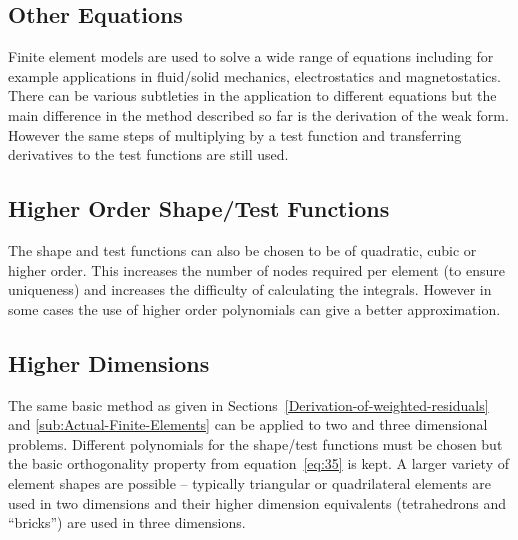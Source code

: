\subsection{Other Equations}
\label{sec:fem-other-equations}

Finite element models are used to solve a wide range of equations including for example applications in fluid/solid mechanics, electrostatics and magnetostatics. There can be various subtleties in the application to different equations but the main difference in the method described so far is the derivation of the weak form. However the same steps of multiplying by a test function and transferring derivatives to the test functions are still used.


\subsection{Higher Order Shape/Test Functions}
\label{sec:fem-high-order-shap}

The shape and test functions can also be chosen to be of quadratic, cubic or higher order. This increases the number of nodes required per element (to ensure uniqueness) and increases the difficulty of calculating the integrals. However in some cases the use of higher order polynomials can give a better approximation.


\subsection{Higher Dimensions}
\label{sec:fem-higher-dimensions}

The same basic method as given in Sections~\ref{Derivation-of-weighted-residuals} and \ref{sub:Actual-Finite-Elements} can be applied to two and three dimensional problems. Different polynomials for the shape/test functions must be chosen but the basic orthogonality property from equation~\eqref{eq:35} is kept. A larger variety of element shapes are possible -- typically triangular or quadrilateral elements are used in two dimensions and their higher dimension equivalents (tetrahedrons and ``bricks'') are used in three dimensions.


